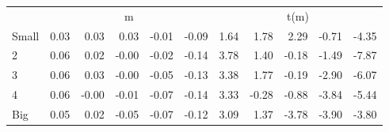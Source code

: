 \begin{table}[!ht]
\begin{tabular}{lrrrrrrrrrr}
  
     & \multicolumn{5}{c}{m} & \multicolumn{5}{c}{t(m)}   \\
     \cmidrule(r){2-6} \cmidrule(r){7-11} 
    Small  & 0.03  & 0.03  & 0.03  & -0.01  & -0.09  & 1.64  & 1.78  & 2.29  & -0.71  & -4.35   \\
    2  & 0.06  & 0.02  & -0.00  & -0.02  & -0.14  & 3.78  & 1.40  & -0.18  & -1.49  & -7.87   \\
    3  & 0.06  & 0.03  & -0.00  & -0.05  & -0.13  & 3.38  & 1.77  & -0.19  & -2.90  & -6.07   \\
    4  & 0.06  & -0.00  & -0.01  & -0.07  & -0.14  & 3.33  & -0.28  & -0.88  & -3.84  & -5.44   \\
    Big  & 0.05  & 0.02  & -0.05  & -0.07  & -0.12  & 3.09  & 1.37  & -3.78  & -3.90  & -3.80   \\
    
  
  \bottomrule
\end{tabular}
\label{tbl:25_Size_Beta_F17}
\end{table}